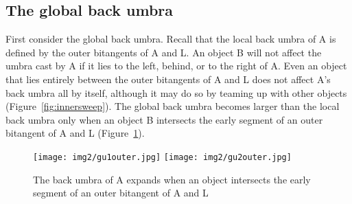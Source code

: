 \documentclass[9pt,twocolumn]{article}
\newif\ifJournal
\begin{document}


\subsection{The global back umbra}

First consider the global back umbra.
%
%
Recall that the local back umbra of A is defined by the outer bitangents of A and L.
An object B will not affect the umbra cast by A if it lies to the left, behind, or to the right of A.
Even an object that lies entirely between the outer bitangents of A and L
does not affect A's back umbra all by itself, although
it may do so by teaming up with other objects
(Figure~\ref{fig:innersweep}).
The global back umbra becomes larger than the local back umbra
only when an object B intersects the early segment of an outer bitangent of A and L 
(Figure~\ref{fig:crossingouter}).

\ifJournal
\begin{lemma}
The global back umbra of A is larger than the local back umbra of A if and only if
another object B intersects the early segment of an outer bitangent of A and L.
\end{lemma}

We shall assume in the sequel that some object B intersects the early segment of an outer bitangent of A and L
(otherwise the global back umbra is equivalent to the local back umbra).
\fi

\begin{figure}[h]
\begin{center}
\texttt{[image: img2/gu1outer.jpg]}
\texttt{[image: img2/gu2outer.jpg]}
\end{center}
\caption{The back umbra of A expands when an object intersects the early segment of an outer bitangent of A and L}
\label{fig:crossingouter}
\end{figure}
\end{document}
